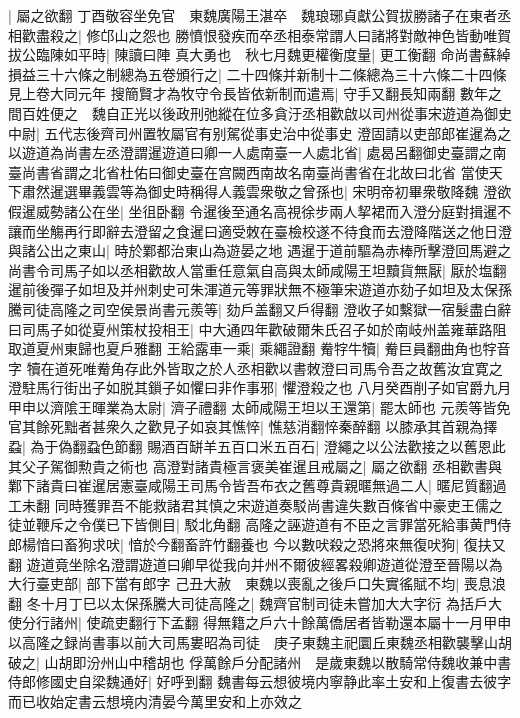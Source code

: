 |{
	屬之欲翻}
丁酉敬容坐免官　東魏廣陽王湛卒　魏琅琊貞獻公賀拔勝諸子在東者丞相歡盡殺之|{
	修邙山之怨也}
勝憤恨發疾而卒丞相泰常謂人曰諸將對敵神色皆動唯賀拔公臨陳如平時|{
	陳讀曰陣}
真大勇也　秋七月魏更權衡度量|{
	更工衡翻}
命尚書蘇綽損益三十六條之制總為五卷頒行之|{
	二十四條并新制十二條總為三十六條二十四條見上卷大同元年}
搜簡賢才為牧守令長皆依新制而遣焉|{
	守手又翻長知兩翻}
數年之間百姓便之　魏自正光以後政刑弛縱在位多貪汙丞相歡啟以司州從事宋遊道為御史中尉|{
	五代志後齊司州置牧屬官有别駕從事史治中從事史}
澄固請以吏部郎崔暹為之以遊道為尚書左丞澄謂暹遊道曰卿一人處南臺一人處北省|{
	處曷呂翻御史臺謂之南臺尚書省謂之北省杜佑曰御史臺在宫闕西南故名南臺尚書省在北故曰北省}
當使天下肅然暹選畢義雲等為御史時稱得人義雲衆敬之曾孫也|{
	宋明帝初畢衆敬降魏}
澄欲假暹威勢諸公在坐|{
	坐徂卧翻}
令暹後至通名高視徐步兩人挈裙而入澄分庭對揖暹不讓而坐觴再行即辭去澄留之食暹曰適受敇在臺檢校遂不待食而去澄降階送之他日澄與諸公出之東山|{
	時於鄴都治東山為遊晏之地}
遇暹于道前驅為赤棒所擊澄回馬避之尚書令司馬子如以丞相歡故人當重任意氣自高與太師咸陽王坦黷貨無厭|{
	厭於塩翻}
暹前後彈子如坦及并州刺史可朱渾道元等罪狀無不極筆宋遊道亦劾子如坦及太保孫騰司徒高隆之司空侯景尚書元羨等|{
	劾戶盖翻又戶得翻}
澄收子如繫獄一宿髮盡白辭曰司馬子如從夏州策杖投相王|{
	中大通四年歡破爾朱氏召子如於南岐州盖雍華路阻取道夏州東歸也夏戶雅翻}
王給露車一乘|{
	乘繩證翻}
觠牸牛犢|{
	觠巨員翻曲角也牸音字}
犢在道死唯觠角存此外皆取之於人丞相歡以書敇澄曰司馬令吾之故舊汝宜寛之澄駐馬行街出子如脱其鎻子如懼曰非作事邪|{
	懼澄殺之也}
八月癸酉削子如官爵九月甲申以濟隂王暉業為太尉|{
	濟子禮翻}
太師咸陽王坦以王還第|{
	罷太師也}
元羨等皆免官其餘死黜者甚衆久之歡見子如哀其憔悴|{
	憔慈消翻悴秦醉翻}
以膝承其首親為擇蝨|{
	為于偽翻蝨色節翻}
賜酒百缾羊五百口米五百石|{
	澄繩之以公法歡接之以舊恩此其父子駕御勲貴之術也}
高澄對諸貴極言褒美崔暹且戒屬之|{
	屬之欲翻}
丞相歡書與鄴下諸貴曰崔暹居憲臺咸陽王司馬令皆吾布衣之舊尊貴親暱無過二人|{
	暱尼質翻過工未翻}
同時獲罪吾不能救諸君其慎之宋遊道奏駁尚書違失數百條省中豪吏王儒之徒並鞭斥之令僕已下皆側目|{
	駁北角翻}
高隆之誣遊道有不臣之言罪當死給事黄門侍郎楊愔曰畜狗求吠|{
	愔於今翻畜許竹翻養也}
今以數吠殺之恐將來無復吠狗|{
	復扶又翻}
遊道竟坐除名澄謂遊道曰卿早從我向并州不爾彼經畧殺卿遊道從澄至晉陽以為大行臺吏部|{
	部下當有郎字}
己丑大赦　東魏以喪亂之後戶口失實徭賦不均|{
	喪息浪翻}
冬十月丁巳以太保孫騰大司徒高隆之|{
	魏齊官制司徒未嘗加大大字衍}
為括戶大使分行諸州|{
	使疏吏翻行下孟翻}
得無籍之戶六十餘萬僑居者皆勒還本屬十一月甲申以高隆之録尚書事以前大司馬婁昭為司徒　庚子東魏主祀圜丘東魏丞相歡襲擊山胡破之|{
	山胡即汾州山中稽胡也}
俘萬餘戶分配諸州　是歲東魏以散騎常侍魏收兼中書侍郎修國史自梁魏通好|{
	好呼到翻}
魏書每云想彼境内寧静此率土安和上復書去彼字而已收始定書云想境内清晏今萬里安和上亦效之

